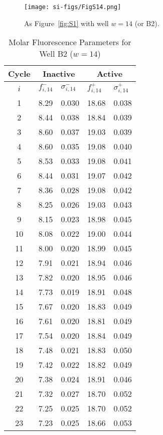                 \begin{figure}
                    \centering
                    \texttt{[image: si-figs/FigS14.png]}
                    \caption{
                        As Figure~\ref{fig:S1} with well $w=14$ (or B2).
                    }
                \end{figure}
                \clearpage
    \begin{table}
        \caption{Molar Fluorescence Parameters for Well B2 ($w=14$)}
        \centering
        \begin{tabular}{c|ll|ll}
            Cycle & \multicolumn{2}{c|}{Inactive} & \multicolumn{2}{c}{Active} \\
            \hline
            $i$ & $f_{i,14}^{-}$ & $\sigma_{i,14}^{-}$ &  $f_{i,14}^{+}$ & $\sigma_{i,14}^{+}$ \\
            \hline
    1 & 8.29 & 0.030 & 18.68 & 0.038 \\
2 & 8.44 & 0.038 & 18.84 & 0.039 \\
3 & 8.60 & 0.037 & 19.03 & 0.039 \\
4 & 8.60 & 0.035 & 19.08 & 0.040 \\
5 & 8.53 & 0.033 & 19.08 & 0.041 \\
6 & 8.44 & 0.031 & 19.07 & 0.042 \\
7 & 8.36 & 0.028 & 19.08 & 0.042 \\
8 & 8.25 & 0.026 & 19.03 & 0.043 \\
9 & 8.15 & 0.023 & 18.98 & 0.045 \\
10 & 8.08 & 0.022 & 19.00 & 0.044 \\
11 & 8.00 & 0.020 & 18.99 & 0.045 \\
12 & 7.91 & 0.021 & 18.94 & 0.046 \\
13 & 7.82 & 0.020 & 18.95 & 0.046 \\
14 & 7.73 & 0.019 & 18.91 & 0.048 \\
15 & 7.67 & 0.020 & 18.83 & 0.049 \\
16 & 7.61 & 0.020 & 18.81 & 0.049 \\
17 & 7.54 & 0.020 & 18.84 & 0.049 \\
18 & 7.48 & 0.021 & 18.83 & 0.050 \\
19 & 7.42 & 0.022 & 18.82 & 0.049 \\
20 & 7.38 & 0.024 & 18.91 & 0.046 \\
21 & 7.32 & 0.027 & 18.70 & 0.052 \\
22 & 7.25 & 0.025 & 18.70 & 0.052 \\
23 & 7.23 & 0.025 & 18.66 & 0.053 \\

\end{tabular}
\end{table}

